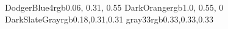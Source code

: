 \providecommand{\definecolor}{}
\definecolor{DodgerBlue4}{rgb}{0.06, 0.31, 0.55}
\definecolor{DarkOrange}{rgb}{1.0, 0.55, 0}
\definecolor{DarkSlateGray}{rgb}{0.18,0.31,0.31}
\definecolor{gray33}{rgb}{0.33,0.33,0.33}